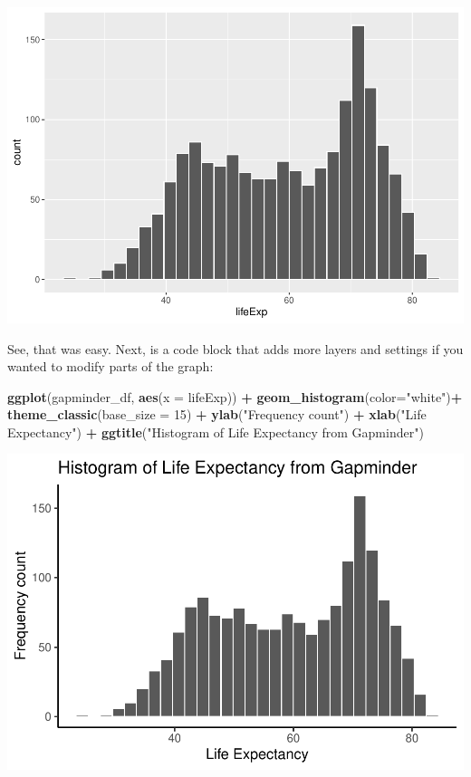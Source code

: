 \documentclass[]{book}
\newenvironment{Shaded}{\begin{snugshade}}{\end{snugshade}}
\newcommand{\KeywordTok}[1]{\textcolor[rgb]{0.13,0.29,0.53}{\textbf{#1}}}
\newcommand{\DataTypeTok}[1]{\textcolor[rgb]{0.13,0.29,0.53}{#1}}
\newcommand{\DecValTok}[1]{\textcolor[rgb]{0.00,0.00,0.81}{#1}}
\newcommand{\StringTok}[1]{\textcolor[rgb]{0.31,0.60,0.02}{#1}}
\newcommand{\OperatorTok}[1]{\textcolor[rgb]{0.81,0.36,0.00}{\textbf{#1}}}
\newcommand{\NormalTok}[1]{#1}
\begin{document}
\includegraphics{Statistics_Lab_files/figure-latex/1gapminder-1.pdf}

See, that was easy. Next, is a code block that adds more layers and
settings if you wanted to modify parts of the graph:

\begin{Shaded}
\begin{Highlighting}[]
\KeywordTok{ggplot}\NormalTok{(gapminder_df, }\KeywordTok{aes}\NormalTok{(}\DataTypeTok{x =}\NormalTok{ lifeExp)) }\OperatorTok{+}
\StringTok{  }\KeywordTok{geom_histogram}\NormalTok{(}\DataTypeTok{color=}\StringTok{"white"}\NormalTok{)}\OperatorTok{+}\StringTok{ }
\StringTok{  }\KeywordTok{theme_classic}\NormalTok{(}\DataTypeTok{base_size =} \DecValTok{15}\NormalTok{) }\OperatorTok{+}
\StringTok{  }\KeywordTok{ylab}\NormalTok{(}\StringTok{"Frequency count"}\NormalTok{) }\OperatorTok{+}\StringTok{ }
\StringTok{  }\KeywordTok{xlab}\NormalTok{(}\StringTok{"Life Expectancy"}\NormalTok{) }\OperatorTok{+}
\StringTok{  }\KeywordTok{ggtitle}\NormalTok{(}\StringTok{"Histogram of Life Expectancy from Gapminder"}\NormalTok{)}
\end{Highlighting}
\end{Shaded}

\includegraphics{Statistics_Lab_files/figure-latex/1gapminderB-1.pdf}
\end{document}
